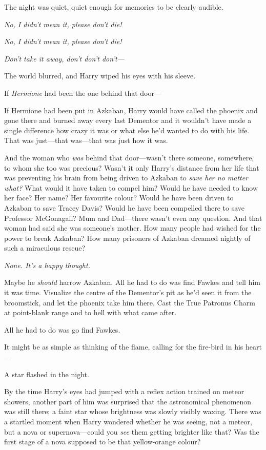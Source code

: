 The night was quiet, quiet enough for memories to be clearly audible.

\emph{No, I didn’t mean it, please don’t die!}

\emph{No, I didn’t mean it, please don’t die!}

\emph{Don’t take it away, don’t don’t don’t—}

The world blurred, and Harry wiped his eyes with his sleeve.

If \emph{Hermione} had been the one behind that door—

If Hermione had been put in Azkaban, Harry would have called the phoenix and gone there and burned away every last Dementor and it wouldn’t have made a single difference how crazy it was or what else he’d wanted to do with his life. That was just—that was—that was just how it was.

And the woman who \emph{was} behind that door—wasn’t there someone, somewhere, to whom she too was precious? Wasn’t it only Harry’s distance from her life that was preventing his brain from being driven to Azkaban to \emph{save her no matter what?} What would it have taken to compel him? Would he have needed to know her face? Her name? Her favourite colour? Would he have been driven to Azkaban to save Tracey Davis? Would he have been compelled there to save Professor McGonagall? Mum and Dad—there wasn’t even any question. And that woman had said she was someone’s mother. How many people had wished for the power to break Azkaban? How many prisoners of Azkaban dreamed nightly of such a miraculous rescue?

\emph{None. It’s a happy thought.}

Maybe he \emph{should} harrow Azkaban. All he had to do was find Fawkes and tell him it was time. Visualize the centre of the Dementor’s pit as he’d seen it from the broomstick, and let the phoenix take him there. Cast the True Patronus Charm at point-blank range and to hell with what came after.

All he had to do was go find Fawkes.

It might be as simple as thinking of the flame, calling for the fire-bird in his heart—

A star flashed in the night.

By the time Harry’s eyes had jumped with a reflex action trained on meteor showers, another part of him was surprised that the astronomical phenomenon was still there; a faint star whose brightness was slowly visibly waxing. There was a startled moment when Harry wondered whether he was seeing, not a meteor, but a nova or supernova—could you \emph{see} them getting brighter like that? Was the first stage of a nova supposed to be that yellow-orange colour?


